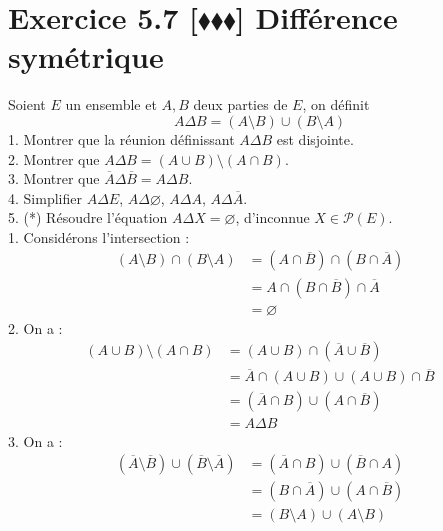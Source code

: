 \documentclass[10pt]{article}
\begin{document}
\section*{Exercice 5.7 [$\blacklozenge\blacklozenge\blacklozenge$] Différence symétrique}
\begin{tcolorbox}[enhanced, width=7in, center, size=fbox, fontupper=\large, drop shadow southwest]
    Soient $E$ un ensemble et $A,B$ deux parties de $E$, on définit 
    \begin{equation*}
        A \Delta B = (A \setminus B) \cup (B \setminus A)
    \end{equation*}
    1. Montrer que la réunion définissant $A \Delta B$ est disjointe.\\
    2. Montrer que $A \Delta B = (A \cup B) \setminus (A \cap B)$.\\
    3. Montrer que $\overline{A} \Delta \overline{B} = A \Delta B$.\\
    4. Simplifier $A \Delta E$, $A \Delta \varnothing$, $A \Delta A$, $A \Delta \overline{A}$.\\
    5. (*) Résoudre l'équation $A \Delta X = \varnothing$, d'inconnue $X \in \mathcal{P}(E)$.\\[0.25cm]
    1. Considérons l'intersection :
    \begin{align*}
        (A \setminus B) \cap (B \setminus A) &= (A \cap \overline{B}) \cap (B \cap \overline{A})\\
        &=A \cap (B \cap \overline{B}) \cap \overline{A}\\
        &=\varnothing
    \end{align*}
    2. On a :
    \begin{align*}
        (A \cup B) \setminus (A \cap B) &= (A \cup B) \cap (\overline{A} \cup \overline{B})\\
        &=\overline{A} \cap (A \cup B) \cup (A \cup B) \cap \overline{B}\\
        &=(\overline{A} \cap B) \cup (A \cap \overline{B})\\
        &=A \Delta B
    \end{align*}
    3. On a :
    \begin{align*}
        (\overline{A} \setminus \overline{B}) \cup (\overline{B} \setminus \overline{A}) &= (\overline{A} \cap B) \cup (\overline{B} \cap A)\\
        &=(B \cap \overline{A}) \cup (A \cap \overline{B})\\
        &=(B \setminus A) \cup (A \setminus B)\\

\end{align*}
\end{tcolorbox}
\end{document}
